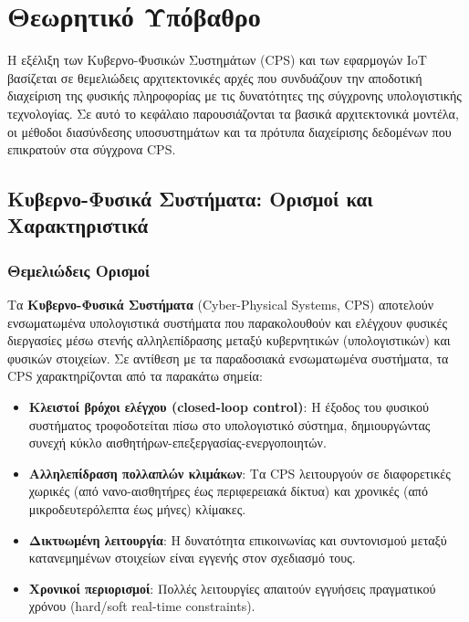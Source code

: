 \chapter{Θεωρητικό Υπόβαθρο}

Η εξέλιξη των Κυβερνο-Φυσικών Συστημάτων (CPS) και των εφαρμογών IoT βασίζεται
σε θεμελιώδεις αρχιτεκτονικές αρχές που συνδυάζουν την αποδοτική διαχείριση της
φυσικής πληροφορίας με τις δυνατότητες της σύγχρονης υπολογιστικής τεχνολογίας.
Σε αυτό το κεφάλαιο παρουσιάζονται τα βασικά αρχιτεκτονικά μοντέλα, οι μέθοδοι
διασύνδεσης υποσυστημάτων και τα πρότυπα διαχείρισης δεδομένων που επικρατούν
στα σύγχρονα CPS.

\section{Κυβερνο-Φυσικά Συστήματα: Ορισμοί και Χαρακτηριστικά}

\subsection{Θεμελιώδεις Ορισμοί}

Τα \textbf{Κυβερνο-Φυσικά Συστήματα} (Cyber-Physical Systems, CPS) αποτελούν
ενσωματωμένα υπολογιστικά συστήματα που παρακολουθούν και ελέγχουν φυσικές
διεργασίες μέσω στενής αλληλεπίδρασης μεταξύ κυβερνητικών (υπολογιστικών) και
φυσικών στοιχείων. Σε αντίθεση με τα παραδοσιακά ενσωματωμένα συστήματα, τα CPS
χαρακτηρίζονται από τα παρακάτω σημεία:

\begin{itemize}
	\item \textbf{Κλειστοί βρόχοι ελέγχου (closed-loop control)}: Η έξοδος του
	      φυσικού συστήματος τροφοδοτείται πίσω στο υπολογιστικό σύστημα,
	      δημιουργώντας συνεχή κύκλο αισθητήρων-επεξεργασίας-ενεργοποιητών.
	\item \textbf{Αλληλεπίδραση πολλαπλών κλιμάκων}: Τα CPS λειτουργούν σε
	      διαφορετικές χωρικές (από νανο-αισθητήρες έως περιφερειακά δίκτυα)
	      και χρονικές (από μικροδευτερόλεπτα έως μήνες) κλίμακες.
	\item \textbf{Δικτυωμένη λειτουργία}: Η δυνατότητα επικοινωνίας και
	      συντονισμού μεταξύ κατανεμημένων στοιχείων είναι εγγενής στον
	      σχεδιασμό τους.
	\item \textbf{Χρονικοί περιορισμοί}: Πολλές λειτουργίες απαιτούν εγγυήσεις
	      πραγματικού χρόνου (hard/soft real-time constraints).
\end{itemize}

